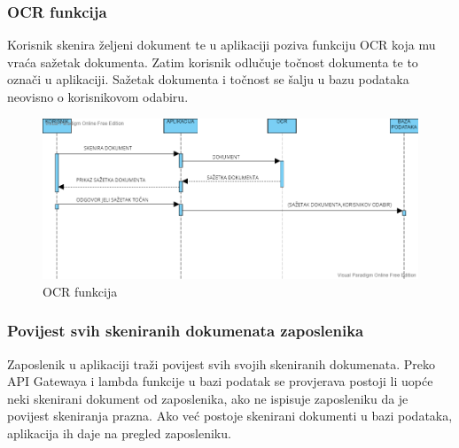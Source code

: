 			\subsubsection{OCR funkcija}
			
			Korisnik skenira željeni dokument te u aplikaciji poziva funkciju OCR koja mu vraća sažetak dokumenta. Zatim korisnik odlučuje točnost dokumenta te to označi u aplikaciji. Sažetak dokumenta i točnost se šalju u bazu podataka neovisno o korisnikovom odabiru.
			\eject
			
			\begin{figure}
				\includegraphics[width=\linewidth]{./dijagrami/OCR.png}
				\caption{OCR funkcija}
				\label{fig:OCR}
			\end{figure}
			
			\subsubsection{Povijest svih skeniranih dokumenata zaposlenika}
			
			Zaposlenik u aplikaciji traži povijest svih svojih skeniranih dokumenata. Preko API Gatewaya i lambda funkcije u bazi podatak se provjerava postoji li uopće neki skenirani dokument od zaposlenika, ako ne ispisuje zaposleniku da je povijest skeniranja prazna. Ako već postoje skenirani dokumenti u bazi podataka, aplikacija ih daje na pregled zaposleniku.
			\eject
			
